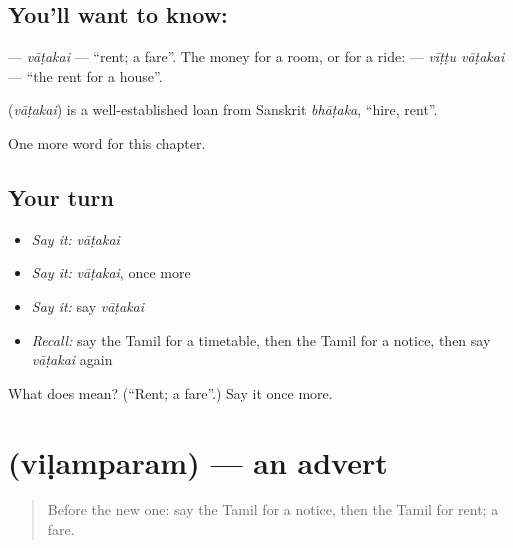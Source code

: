 \subsection*{You'll want to know: }
\textbf{} — \emph{vāṭakai} — \textquotedblleft{}rent; a fare\textquotedblright{}. The money for a room, or for a ride: \textbf{ } — \emph{vīṭṭu vāṭakai} — \textquotedblleft{}the rent for a house\textquotedblright{}.

\begin{cousinweb}
\textbf{} (\emph{vāṭakai}) is a well-established loan from Sanskrit \emph{bhāṭaka}, \textquotedblleft{}hire, rent\textquotedblright{}.
\end{cousinweb}

\begin{grammarlens}[title={What you've built}]
One more word for this chapter.
\end{grammarlens}

\subsection*{Your turn}
\begin{itemize}
\raggedright
  \item \emph{Say it:} \emph{vāṭakai}
  \item \emph{Say it:} \emph{vāṭakai}, once more
  \item \emph{Say it:} say \emph{vāṭakai}
  \item \emph{Recall:} say the Tamil for a timetable, then the Tamil for a notice, then say \emph{vāṭakai} again
\end{itemize}

\begin{tcolorbox}[breakable,colback=teal!4,colframe=teal!35!black,title={Before you move on}]
What does  mean? (\textquotedblleft{}Rent; a fare\textquotedblright{}.) Say it once more.
\end{tcolorbox}
\section[\texorpdfstring{\ta{விளம்பரம்} (viḷamparam)}{விளம்பரம் (viḷamparam)}]{ (viḷamparam) — an advert}

\label{lesson:TA-C160-vilamparam}



\begin{quote}
Before the new one: say the Tamil for a notice, then the Tamil for rent; a fare.
\end{quote}

